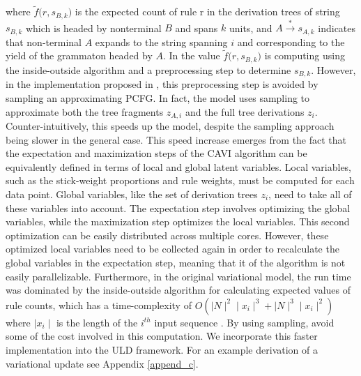 \documentclass[12pt,letterpaper]{article}
\begin{document}
where $\tilde f \Big(r, s_{B,k}\Big)$ is the expected count of rule r in the derivation trees of string $s_{B,k}$ which is headed by nonterminal $B$ and spans $k$ units, and $A \overset{*}{\rightarrow} s_{A,k}$ indicates that non-terminal $A$ expands to the string spanning $i$ and corresponding to the yield of the grammaton headed by $A$. In \citet{cohen:2010} the value $\tilde f \Big(r, s_{B,k}\Big)$ is computing using the inside-outside algorithm and a preprocessing step to determine $s_{B,k}$. However, in the implementation proposed in \citet{zhai:2014}, this preprocessing step is avoided by sampling an approximating PCFG. In fact, the \citet{zhai:2014} model uses sampling to approximate both the tree fragments $z_{A,i}$ and the full tree derivations $z_i$. Counter-intuitively, this speeds up the model, despite the sampling approach being slower in the general case. This speed increase emerges from the fact that the expectation and maximization steps of the CAVI algorithm can be equivalently defined in terms of local and global latent variables. Local variables, such as the stick-weight proportions and rule weights, must be computed for each data point. Global variables, like the set of derivation trees $z_i$, need to take all of these variables into account. The expectation step involves optimizing the global variables, while the maximization step optimizes the local variables. This second optimization can be easily distributed across multiple cores. However, these optimized local variables need to be collected again in order to recalculate the global variables in the expectation step, meaning that it of the algorithm is not easily parallelizable. Furthermore, in the original variational model, the run time was dominated by the inside-outside algorithm for calculating expected values of rule counts, which has a time-complexity of $O(\mid N \mid^2 \mid x_i \mid^3 + \mid N \mid^3\mid x_i\mid^2)$ where $\mid x_i \mid$ is the length of the $i^{th}$ input sequence \citep{cohen:2010}. By using sampling, \citet{zhai:2014} avoid some of the cost involved in this computation. We incorporate this faster implementation into the ULD framework. For an example derivation of a variational update see Appendix \ref{append_c}. 
\end{document}
